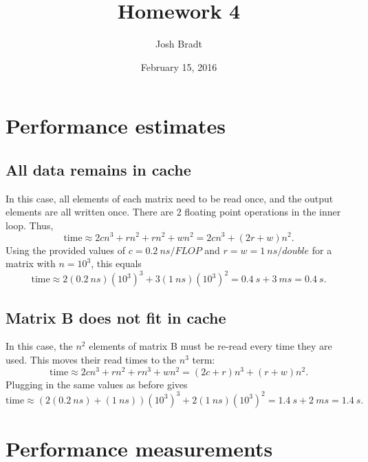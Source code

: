 \documentclass{article}
\title{Homework 4}
\author{Josh Bradt}
\date{February 15, 2016}
\begin{document}
\maketitle

\section{Performance estimates}

    \subsection{All data remains in cache}

        In this case, all elements of each matrix need to be read once, and the output elements are all written once. There are 2 floating point operations in the inner loop. Thus,
        \begin{equation}
            \text{time} \approx 2cn^3 + rn^2 + rn^2 + wn^2 = 2cn^3 + (2r+w)n^2.
        \end{equation}
        Using the provided values of $c=\SI{0.2}{ns/FLOP}$ and $r=w=\SI{1}{ns/double}$ for a matrix with $n=10^3$, this equals
        \begin{equation*}
            \text{time} \approx 2(\SI{0.2}{ns})(10^3)^3 + 3(\SI{1}{ns})(10^3)^2 = \SI{0.4}{s} + \SI{3}{ms} = \SI{0.4}{s}.
        \end{equation*}

    \subsection{Matrix B does not fit in cache}

        In this case, the $n^2$ elements of matrix B must be re-read every time they are used. This moves their read times to the $n^3$ term:
        \begin{equation}
            \text{time} \approx 2cn^3 + rn^2 + rn^3 + wn^2 = (2c+r)n^3 + (r+w)n^2.
        \end{equation}
        Plugging in the same values as before gives
        \begin{equation*}
            \text{time} \approx (2(\SI{0.2}{ns})+(\SI{1}{ns}))(10^3)^3 + 2(\SI{1}{ns})(10^3)^2 = \SI{1.4}{s} + \SI{2}{ms} = \SI{1.4}{s}.
        \end{equation*}

\section{Performance measurements}
\end{document}

